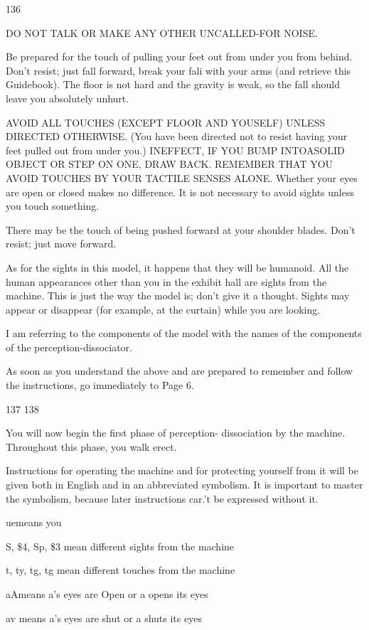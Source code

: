 \documentclass[10pt,twoside]{memoir}
\begin{document}
\begin{enumerate}
{\begin{enumerate}
\begin{sysrules}
\begin{sysrules}
\begin{sysrules}
\begin{sysrules}
{\begin{enumerate}
{{{{136 


DO NOT TALK OR MAKE ANY OTHER UNCALLED-FOR NOISE. 


Be prepared for the touch of pulling your feet out from under you 
from behind. Don't resist; just fall forward, break your fali with your arms 
(and retrieve this Guidebook). The floor is not hard and the gravity is weak, 
so the fall should leave you absolutely unhurt. 


AVOID ALL TOUCHES (EXCEPT FLOOR AND YOUSELF) UNLESS 
DIRECTED OTHERWISE. (You have been directed not to resist having your 
feet pulled out from under you.) INEFFECT, IF YOU BUMP INTOASOLID 
OBJECT OR STEP ON ONE, DRAW BACK. REMEMBER THAT YOU 
AVOID TOUCHES BY YOUR TACTILE SENSES ALONE. Whether your 
eyes are open or closed makes no difference. It is not necessary to avoid 
sights unless you touch something. 


There may be the touch of being pushed forward at your shoulder 
blades. Don't resist; just move forward. 


As for the sights in this model, it happens that they will be humanoid. 
All the human appearances other than you in the exhibit hall are sights from 
the machine. This is just the way the model is; don't give it a thought. Sights 
may appear or disappear (for example, at the curtain) while you are looking. 


I am referring to the components of the model with the names of the 
components of the perception-dissociator. 


As soon as you understand the above and are prepared to remember 
and follow the instructions, go immediately to Page 6. 


137 
138 


You will now begin the first phase of perception- dissociation by the 
machine. Throughout this phase, you walk erect. 


Instructions for operating the machine and for protecting yourself from 
it will be given both in English and in an abbreviated symbolism. It is 
important to master the symbolism, because later instructions car.'t be 
expressed without it. 


uemeans you 

S, \$4, Sp, \$3 mean different sights from the machine 

t, ty, tg, tg mean different touches from the machine 

aAmeans a's eyes are Open or a opens its eyes 

av means a's eyes are shut or a shuts its eyes 

}}}}
\end{enumerate}}
\end{sysrules}
\end{sysrules}
\end{sysrules}
\end{sysrules}
\end{enumerate}}
\end{enumerate}
\end{document}
